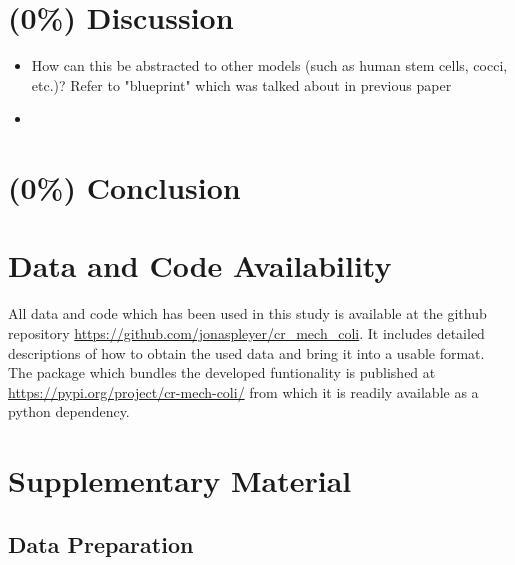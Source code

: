 \documentclass{article}
\begin{document}
\section{(0\%) Discussion}
\begin{itemize}
    \item How can this be abstracted to other models (such as human stem cells, cocci, etc.)? Refer
        to "blueprint" which was talked about in previous paper
    \item 
\end{itemize}
\section{(0\%) Conclusion}

\section{Data and Code Availability}
All data and code which has been used in this study is available at the github repository
\url{https://github.com/jonaspleyer/cr\_mech\_coli}.
It includes detailed descriptions of how to obtain the used data and bring it into a usable format.
The package which bundles the developed funtionality is published at
\url{https://pypi.org/project/cr-mech-coli/} from which it is readily available as a python
dependency.




\appendix
\renewcommand{\thesection}{}
\renewcommand{\thesubsection}{S\arabic{subsection}}
\section{Supplementary Material}

\subsection{Data Preparation}
\end{document}
